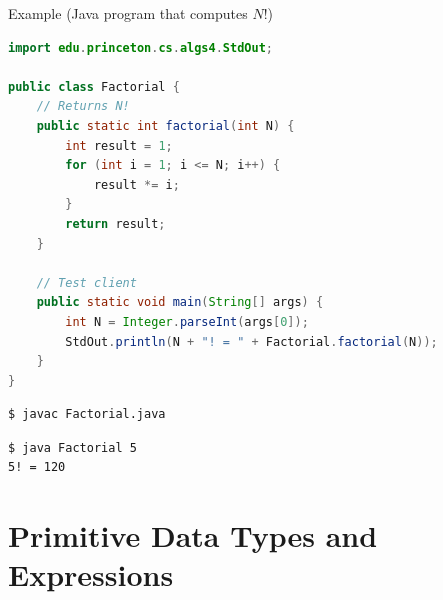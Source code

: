 \documentclass[8pt,a4paper,compress]{beamer}
\begin{document}
\begin{frame}[fragile]
\pause

Example (Java program that computes $N!$)

\smallskip

\begin{lstlisting}[language=Java,style=focusin]
import edu.princeton.cs.algs4.StdOut;

public class Factorial {
    // Returns N!
    public static int factorial(int N) {
        int result = 1;
        for (int i = 1; i <= N; i++) {
            result *= i;
        }
        return result;
    }

    // Test client
    public static void main(String[] args) {
        int N = Integer.parseInt(args[0]);
        StdOut.println(N + "! = " + Factorial.factorial(N));
    }
}
\end{lstlisting}

\pause\bigskip

\begin{lstlisting}[language={},style=focusin]
$ javac Factorial.java
\end{lstlisting}

\pause\bigskip

\begin{lstlisting}[language={},style=focusin]
$ java Factorial 5
5! = 120
\end{lstlisting}
\end{frame}

\section{Primitive Data Types and Expressions}
\end{document}
